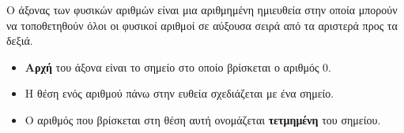Ο άξονας των φυσικών αριθμών είναι μια αριθμημένη ημιευθεία στην οποία μπορούν να τοποθετηθούν όλοι οι φυσικοί αριθμοί σε αύξουσα σειρά από τα αριστερά προς τα δεξιά.
\begin{center}
\end{center}
\begin{itemize}[itemsep=0mm]
\item \textbf{Αρχή} του άξονα είναι το σημείο στο οποίο βρίσκεται ο αριθμός $ 0 $.
\item Η θέση ενός αριθμού πάνω στην ευθεία σχεδιάζεται με ένα σημείο.
\item Ο αριθμός που βρίσκεται στη θέση αυτή ονομάζεται \textbf{τετμημένη} του σημείου.
\end{itemize}
